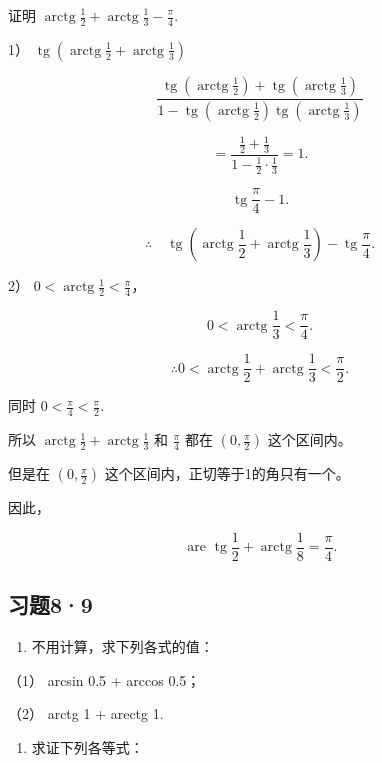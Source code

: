 证明
\(\operatorname{arctg} \frac{1}{2} + \operatorname{arctg} \frac{1}{3} - \frac{\pi}{4}\).

 1）
\(\operatorname{tg}\left(\operatorname{arctg}\frac{1}{2} + \operatorname{arctg}\frac{1}{3}\right)\)

\[
\frac {\operatorname{tg} \left(\operatorname{arctg} \frac {1}{2}\right) + \operatorname{tg} \left(\operatorname{arctg} \frac {1}{3}\right)}{1 - \operatorname{tg} \left(\operatorname{arctg} \frac {1}{2}\right) \operatorname{tg} \left(\operatorname{arctg} \frac {1}{3}\right)}
\]

\[
= \frac {\frac {1}{2} + \frac {1}{3}}{1 - \frac {1}{2} \cdot \frac {1}{3}} = 1.
\]

\[
\operatorname{tg} \frac {\pi}{4} - 1.
\]

\[
\therefore \quad \operatorname{tg} \left(\operatorname{arctg} \frac {1}{2} + \operatorname{arctg} \frac {1}{3}\right) - \operatorname{tg} \frac {\pi}{4}.
\]

2） \(0 < \operatorname{arctg} \frac{1}{2} < \frac{\pi}{4}\)，

\[
0 <   \operatorname{arctg} \frac {1}{3} <   \frac {\pi}{4}.
\]

\[
\therefore 0 <   \operatorname{arctg} \frac {1}{2} + \operatorname{arctg} \frac {1}{3} <   \frac {\pi}{2}.
\]

同时 \(0 < \frac{\pi}{4} < \frac{\pi}{2}\).

所以
\(\operatorname{arctg} \frac{1}{2} + \operatorname{arctg} \frac{1}{3}\)
和 \(\frac{\pi}{4}\) 都在 \(\left(0, \frac{\pi}{2}\right)\) 这个区间内。

但是在 \(\left(0, \frac{\pi}{2}\right)\)
这个区间内，正切等于1的角只有一个。

因此，

\[
\text { are   } \operatorname{tg} \frac {1}{2} + \operatorname{arctg} \frac {1}{8} = \frac {\pi}{4}.
\]

\subsection{习题8·9}

\begin{enumerate}
\item
  不用计算，求下列各式的值：
\end{enumerate}

（1） arcsin 0.5 + arccos 0.5；

（2） arctg 1 + arectg 1.

\begin{enumerate}[start=2]
\item
  求证下列各等式：
\end{enumerate}

